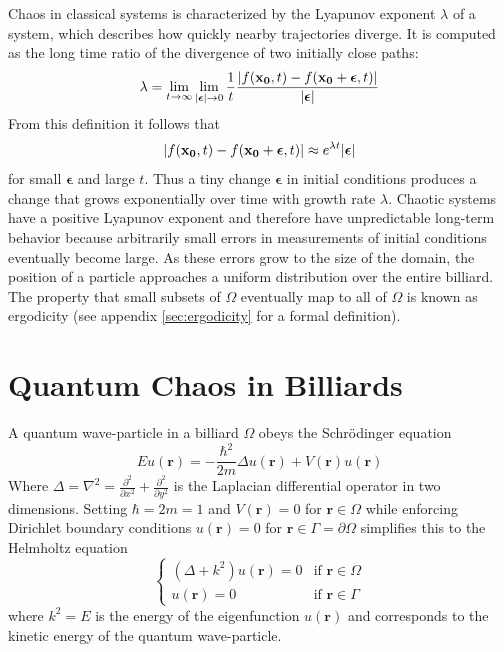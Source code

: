 \documentclass{report}
\newcommand{\rr}[0]{\mathbf{r}}
\begin{document}
Chaos in classical systems is characterized by the Lyapunov exponent $\lambda$ of a system, which describes how quickly nearby trajectories diverge. It is computed as the long time ratio of the divergence of two initially close paths:
\[
\lambda = \lim_{t \to \infty} \lim_{\vert \boldsymbol\epsilon \vert \to 0} \frac{1}{t} \frac{\vert f({\bf x_{0}}, t) - f({\bf x_{0}} + \boldsymbol\epsilon, t) \vert}{\vert \boldsymbol\epsilon \vert}
\]
From this definition it follows that
\[
\vert f({\bf x_{0}}, t) - f({\bf x_{0}} + \boldsymbol\epsilon, t) \vert \approx e^{\lambda t} \vert \boldsymbol\epsilon \vert
\]
for small $\boldsymbol\epsilon$ and large $t$. Thus a tiny change $\boldsymbol\epsilon$ in initial conditions produces a change that grows exponentially over time with growth rate $\lambda$. Chaotic systems have a positive Lyapunov exponent and therefore have unpredictable long-term behavior because arbitrarily small errors in measurements of initial conditions eventually become large. As these errors grow to the size of the domain, the position of a particle approaches a uniform distribution over the entire billiard. The property that small subsets of $\Omega$ eventually map to all of $\Omega$ is known as ergodicity (see appendix \ref{sec:ergodicity} for a formal definition).

\section{Quantum Chaos in Billiards}
\label{sec:billiards}
A quantum wave-particle in a billiard $\Omega$ obeys the Schr\"odinger equation
\[
E u(\rr) = - \frac{\hbar^{2}}{2m} \Delta u(\rr) + V(\rr) u(\rr)
\]
Where $\Delta = \nabla^{2} = \frac{\partial^{2}}{\partial x^{2}} + \frac{\partial^{2}}{\partial y^{2}}$ is the Laplacian differential operator in two dimensions. Setting $\hbar = 2m = 1$ and $V(\rr) = 0$ for $\rr \in \Omega$ while enforcing Dirichlet boundary conditions $u(\rr) = 0$ for $\rr \in \Gamma = \partial \Omega$ simplifies this to the Helmholtz equation
\begin{equation}
\label{eq:helmholtz}
\begin{cases}
(\Delta + k^{2})u(\rr) = 0 & \text{if } \rr \in \Omega\\
  u(\rr) = 0 & \text{if } \rr \in \Gamma
\end{cases}
\end{equation}
where $k^{2} = E$ is the energy of the eigenfunction $u(\rr)$ and corresponds to the kinetic energy of the quantum wave-particle.
\end{document}
